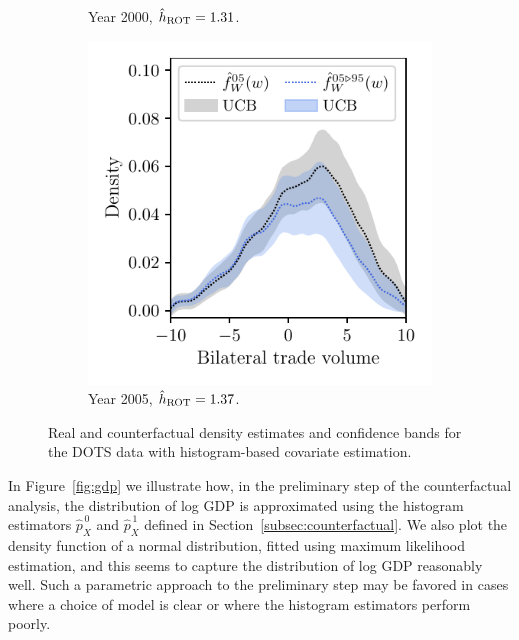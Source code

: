 \begin{figure}[t]
\begin{subfigure}{0.32\textwidth}
    \caption{Year 2000, $\hat h_{\operatorname{ROT}} = 1.31$.}
  \end{subfigure}
  \begin{subfigure}{0.32\textwidth}
    \centering
    \includegraphics[scale=0.64]{graphics/trade_plot_1995_2005.pdf}
    \caption{Year 2005, $\hat h_{\operatorname{ROT}} = 1.37$.}
  \end{subfigure}
  \caption[Histogram-based estimation and inference for the DOTS data]{
    Real and counterfactual density estimates and confidence bands for
  the DOTS data with histogram-based covariate estimation.}
  \label{fig:trade}
\end{figure}

In Figure~\ref{fig:gdp} we illustrate how, in the preliminary step of the
counterfactual analysis, the distribution of log GDP is approximated using the
histogram estimators $\hat p_X^{\,0}$ and $\hat p_X^{\,1}$ defined in
Section~\ref{subsec:counterfactual}. We also plot the density function of a
normal distribution, fitted using maximum likelihood estimation, and this seems
to capture the distribution of log GDP reasonably well. Such a parametric
approach to the preliminary step may be favored in cases where a choice of
model is clear or where the histogram estimators perform poorly.

